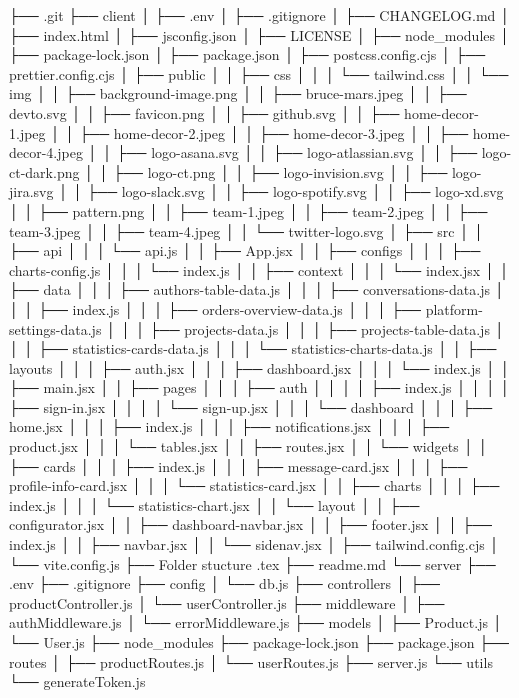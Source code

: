 ├── .git
├── client
│   ├── .env
│   ├── .gitignore
│   ├── CHANGELOG.md
│   ├── index.html
│   ├── jsconfig.json
│   ├── LICENSE
│   ├── node_modules
│   ├── package-lock.json
│   ├── package.json
│   ├── postcss.config.cjs
│   ├── prettier.config.cjs
│   ├── public
│   │   ├── css
│   │   │   └── tailwind.css
│   │   └── img
│   │       ├── background-image.png
│   │       ├── bruce-mars.jpeg
│   │       ├── devto.svg
│   │       ├── favicon.png
│   │       ├── github.svg
│   │       ├── home-decor-1.jpeg
│   │       ├── home-decor-2.jpeg
│   │       ├── home-decor-3.jpeg
│   │       ├── home-decor-4.jpeg
│   │       ├── logo-asana.svg
│   │       ├── logo-atlassian.svg
│   │       ├── logo-ct-dark.png
│   │       ├── logo-ct.png
│   │       ├── logo-invision.svg
│   │       ├── logo-jira.svg
│   │       ├── logo-slack.svg
│   │       ├── logo-spotify.svg
│   │       ├── logo-xd.svg
│   │       ├── pattern.png
│   │       ├── team-1.jpeg
│   │       ├── team-2.jpeg
│   │       ├── team-3.jpeg
│   │       ├── team-4.jpeg
│   │       └── twitter-logo.svg
│   ├── src
│   │   ├── api
│   │   │   └── api.js
│   │   ├── App.jsx
│   │   ├── configs
│   │   │   ├── charts-config.js
│   │   │   └── index.js
│   │   ├── context
│   │   │   └── index.jsx
│   │   ├── data
│   │   │   ├── authors-table-data.js
│   │   │   ├── conversations-data.js
│   │   │   ├── index.js
│   │   │   ├── orders-overview-data.js
│   │   │   ├── platform-settings-data.js
│   │   │   ├── projects-data.js
│   │   │   ├── projects-table-data.js
│   │   │   ├── statistics-cards-data.js
│   │   │   └── statistics-charts-data.js
│   │   ├── layouts
│   │   │   ├── auth.jsx
│   │   │   ├── dashboard.jsx
│   │   │   └── index.js
│   │   ├── main.jsx
│   │   ├── pages
│   │   │   ├── auth
│   │   │   │   ├── index.js
│   │   │   │   ├── sign-in.jsx
│   │   │   │   └── sign-up.jsx
│   │   │   └── dashboard
│   │   │       ├── home.jsx
│   │   │       ├── index.js
│   │   │       ├── notifications.jsx
│   │   │       ├── product.jsx
│   │   │       └── tables.jsx
│   │   ├── routes.jsx
│   │   └── widgets
│   │       ├── cards
│   │       │   ├── index.js
│   │       │   ├── message-card.jsx
│   │       │   ├── profile-info-card.jsx
│   │       │   └── statistics-card.jsx
│   │       ├── charts
│   │       │   ├── index.js
│   │       │   └── statistics-chart.jsx
│   │       └── layout
│   │           ├── configurator.jsx
│   │           ├── dashboard-navbar.jsx
│   │           ├── footer.jsx
│   │           ├── index.js
│   │           ├── navbar.jsx
│   │           └── sidenav.jsx
│   ├── tailwind.config.cjs
│   └── vite.config.js
├── Folder stucture .tex
├── readme.md
└── server
    ├── .env
    ├── .gitignore
    ├── config
    │   └── db.js
    ├── controllers
    │   ├── productController.js
    │   └── userController.js
    ├── middleware
    │   ├── authMiddleware.js
    │   └── errorMiddleware.js
    ├── models
    │   ├── Product.js
    │   └── User.js
    ├── node_modules
    ├── package-lock.json
    ├── package.json
    ├── routes
    │   ├── productRoutes.js
    │   └── userRoutes.js
    ├── server.js
    └── utils
        └── generateToken.js
